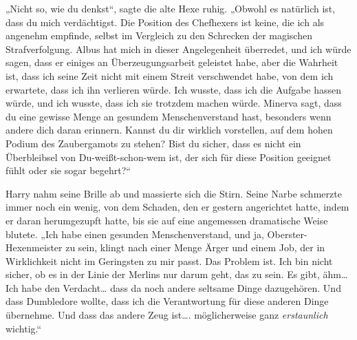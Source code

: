 „Nicht so, wie du denkst“, sagte die alte Hexe ruhig. „Obwohl es natürlich ist, dass du mich verdächtigst. Die Position des Chefhexers ist keine, die ich als angenehm empfinde, selbst im Vergleich zu den Schrecken der magischen Strafverfolgung. Albus hat mich in dieser Angelegenheit überredet, und ich würde sagen, dass er einiges an Überzeugungsarbeit geleistet habe, aber die Wahrheit ist, dass ich seine Zeit nicht mit einem Streit verschwendet habe, von dem ich erwartete, dass ich ihn verlieren würde. Ich wusste, dass ich die Aufgabe hassen würde, und ich wusste, dass ich sie trotzdem machen würde. Minerva sagt, dass du eine gewisse Menge an gesundem Menschenverstand hast, besonders wenn andere dich daran erinnern. Kannst du dir wirklich vorstellen, auf dem hohen Podium des Zaubergamots zu stehen? Bist du sicher, dass es nicht ein Überbleibsel von Du-weißt-schon-wem ist, der sich für diese Position geeignet fühlt oder sie sogar begehrt?“

Harry nahm seine Brille ab und massierte sich die Stirn. Seine Narbe schmerzte immer noch ein wenig, von dem Schaden, den er gestern angerichtet hatte, indem er daran herumgezupft hatte, bis sie auf eine angemessen dramatische Weise blutete.
„Ich habe einen gesunden Menschenverstand, und ja, Oberster-Hexenmeister zu sein, klingt nach einer Menge Ärger und einem Job, der in Wirklichkeit nicht im Geringsten zu mir passt. Das Problem ist. Ich bin nicht sicher, ob es in der Linie der Merlins nur darum geht, das zu sein. Es gibt, ähm… Ich habe den Verdacht… dass da noch andere seltsame Dinge dazugehören. Und dass Dumbledore wollte, dass ich die Verantwortung für diese anderen Dinge übernehme. Und dass das andere Zeug ist…. möglicherweise ganz \emph{erstaunlich} wichtig.“

